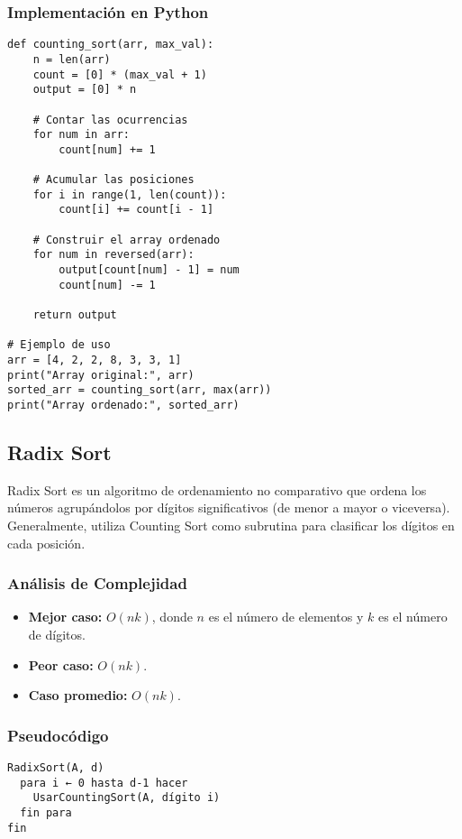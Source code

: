 \documentclass[11pt,openany]{book}
\begin{document}
\subsubsection{Implementación en Python}
\lstset{language=Python}
\begin{lstlisting}
def counting_sort(arr, max_val):
    n = len(arr)
    count = [0] * (max_val + 1)
    output = [0] * n

    # Contar las ocurrencias
    for num in arr:
        count[num] += 1

    # Acumular las posiciones
    for i in range(1, len(count)):
        count[i] += count[i - 1]

    # Construir el array ordenado
    for num in reversed(arr):
        output[count[num] - 1] = num
        count[num] -= 1

    return output

# Ejemplo de uso
arr = [4, 2, 2, 8, 3, 3, 1]
print("Array original:", arr)
sorted_arr = counting_sort(arr, max(arr))
print("Array ordenado:", sorted_arr)
\end{lstlisting}


\subsection{Radix Sort}
Radix Sort es un algoritmo de ordenamiento no comparativo que ordena los números agrupándolos por dígitos significativos (de menor a mayor o viceversa). Generalmente, utiliza Counting Sort como subrutina para clasificar los dígitos en cada posición.

\subsubsection{Análisis de Complejidad}
\begin{itemize}
    \item \textbf{Mejor caso:} $O(nk)$, donde $n$ es el número de elementos y $k$ es el número de dígitos.
    \item \textbf{Peor caso:} $O(nk)$.
    \item \textbf{Caso promedio:} $O(nk)$.
\end{itemize}

\subsubsection{Pseudocódigo}
\begin{verbatim}
RadixSort(A, d)
  para i ← 0 hasta d-1 hacer
    UsarCountingSort(A, dígito i)
  fin para
fin
\end{verbatim}
\end{document}
